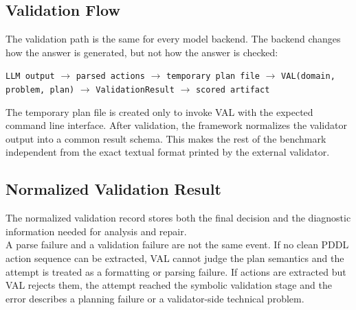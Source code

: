 \subsection{Validation Flow}

The validation path is the same for every model backend. The backend changes how
the answer is generated, but not how the answer is checked:

\begin{center}
\texttt{LLM output}
$\rightarrow$ \texttt{parsed actions}
$\rightarrow$ \texttt{temporary plan file}
$\rightarrow$ \texttt{VAL(domain, problem, plan)}
$\rightarrow$ \texttt{ValidationResult}
$\rightarrow$ \texttt{scored artifact}
\end{center}

The temporary plan file is created only to invoke VAL with the expected command
line interface. After validation, the framework normalizes the validator output
into a common result schema. This makes the rest of the benchmark independent
from the exact textual format printed by the external validator.

\subsection{Normalized Validation Result}

The normalized validation record stores both the final decision and the
diagnostic information needed for analysis and repair.\\
A parse failure and a validation failure are not the same event. If no clean
PDDL action sequence can be extracted, VAL cannot judge the plan semantics and
the attempt is treated as a formatting or parsing failure. If actions are
extracted but VAL rejects them, the attempt reached the symbolic validation
stage and the error describes a planning failure or a validator-side technical
problem.

